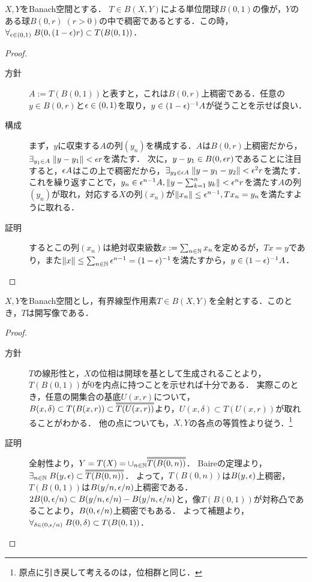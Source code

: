 \documentclass[uplatex,dvipdfmx]{jsreport}
\begin{document}
\begin{lemma}[単位閉球の像の描像]\label{lemma-image-of-ball}
    $X,Y$をBanach空間とする．
    $T\in B(X,Y)$による単位閉球$B(0,1)$の像が，$Y$のある球$B(0,r)\;(r>0)$の中で稠密であるとする．この時，$\forall_{\epsilon\in(0,1)}\; B(0,(1-\epsilon)r)\subset T(B(0,1))$．
\end{lemma}
\begin{proof}\mbox{}
    \begin{description}
        \item[方針] $A:=T(B(0,1))$と表すと，これは$B(0,r)$上稠密である．任意の$y\in B(0,r)$と$\epsilon\in(0,1)$を取り，$y\in(1-\epsilon)^{-1}A$が従うことを示せば良い．
        \item[構成] まず，$y$に収束する$A$の列$(y_n)$を構成する．$A$は$B(0,r)$上稠密だから，$\exists_{y_1\in A}\;\|y-y_1\|<\epsilon r$を満たす．
        次に，$y-y_1\in B(0,\epsilon r)$であることに注目すると，$\epsilon A$はこの上で稠密だから，$\exists_{y_2\in\epsilon A}\;\|y-y_1-y_2\|<\epsilon^2r$を満たす．
        これを繰り返すことで，$y_n\in\epsilon^{n-1}A,\left\|y-\sum^n_{k=1}y_k\right\|<\epsilon^nr$を満たす$A$の列$(y_n)$が取れ，対応する$X$の列$(x_n)$が$\|x_n\|\le\epsilon^{n-1},Tx_n=y_n$を満たすように取れる．
        \item[証明] するとこの列$(x_n)$は絶対収束級数$x:=\sum_{n\in\mathbb{N}}x_n$を定めるが，$Tx=y$であり，また$\|x\|\le\sum_{n\in\mathbb{N}}\epsilon^{n-1}=(1-\epsilon)^{-1}$を満たすから，$y\in(1-\epsilon)^{-1}A$．
    \end{description}
\end{proof}

\begin{theorem}[開写像定理]\label{thm-open-mapping-theorem}
    $X,Y$をBanach空間とし，有界線型作用素$T\in B(X,Y)$を全射とする．このとき，$T$は開写像である．
\end{theorem}
\begin{proof}\mbox{}
    \begin{description}
        \item[方針] $T$の線形性と，$X$の位相は開球を基として生成されることより，$T(B(0,1))$が$0$を内点に持つことを示せれば十分である．
        実際このとき，任意の開集合の基底$U(x,r)$について，$B(x,\delta)\subset T(B(x,r))\subset\oo{T(U(x,r))}$より，$U(x,\delta)\subset T(U(x,r))$が取れることがわかる．
        他の点についても，$X,Y$の各点の等質性より従う．\footnote{原点に引き戻して考えるのは，位相群と同じ．}
        \item[証明] 全射性より，$Y=T(X)=\cup_{n\in\N}\oo{T(B(0,n))}$．
        Baireの定理より，$\exists_{n\in\N}\;B(y,\ep)\subset\oo{T(B(0,n))}$．
        よって，$T(B(0,n))$は$B(y,\epsilon)$上稠密，
        $T(B(0,1))$は$B(y/n,\epsilon/n)$上稠密である．
        $2B(0,\epsilon/n)\subset B(y/n,\epsilon/n)-B(y/n,\epsilon/n)$と，像$T(B(0,1))$が対称凸であることより，$B(0,\epsilon/n)$上稠密でもある．
        よって補題より，$\forall_{\delta\in(0,\epsilon/n)}\;B(0,\delta)\subset T(B(0,1))$．
    \end{description}
\end{proof}
\end{document}

